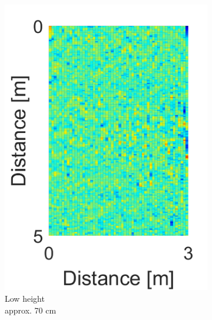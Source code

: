 \begin{figure}[H]
\captionsetup{belowskip=0em}
\centering
\begin{subfigure}[b]{0.29\textwidth}
\includegraphics[width=\textwidth]{figures/Norm_space_1.png}
\caption{Low height \\ approx. 70 cm}
\label{Norm_low}
\end{subfigure}
\begin{subfigure}[b]{0.29\textwidth}

\end{subfigure}
\end{figure}
